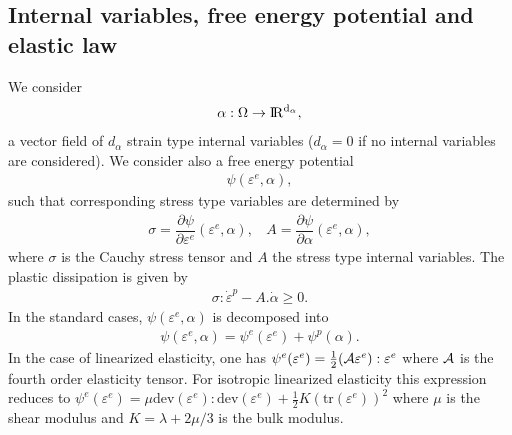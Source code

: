 \documentclass[a4paper,11pt,english]{sphinxmanual}
\begin{document}
\subsection{Internal variables, free energy potential and elastic law}
\label{\detokenize{userdoc/model_plasticity_small_strain:internal-variables-free-energy-potential-and-elastic-law}}
We consider
\begin{equation*}
\begin{split}\alpha : \Omega \rightarrow \rm I\hspace{-0.15em}R^{d_{\alpha}},\end{split}
\end{equation*}
a vector field of \(d_{\alpha}\) strain type internal variables (\(d_{\alpha} = 0\) if no internal variables are considered). We consider also a free energy potential
\begin{equation*}
\begin{split}\psi(\varepsilon^e, \alpha),\end{split}
\end{equation*}
such that corresponding stress type variables are determined by
\begin{equation*}
\begin{split}\sigma = \dfrac{\partial \psi}{\partial \varepsilon^e}(\varepsilon^e, \alpha), ~~~~ A =  \dfrac{\partial \psi}{\partial \alpha}(\varepsilon^e, \alpha),\end{split}
\end{equation*}
where \(\sigma\) is the Cauchy stress tensor and \(A\) the stress type internal variables. The plastic dissipation is given by
\begin{equation*}
\begin{split}\sigma:\dot{\varepsilon}^p - A.\dot{\alpha} \ge 0.\end{split}
\end{equation*}
In the standard cases, \(\psi(\varepsilon^e, \alpha)\) is decomposed into
\begin{equation*}
\begin{split}\psi(\varepsilon^e, \alpha) = \psi^e(\varepsilon^e) + \psi^p(\alpha).\end{split}
\end{equation*}
In the case of linearized elasticity, one has \(\psi^e(\varepsilon^e) = \frac{1}{2} ({\cal A}\varepsilon^e) :\varepsilon^e\) where \({\cal A}\) is the fourth order elasticity tensor. For isotropic linearized elasticity this expression reduces to \(\psi^e(\varepsilon^e) = \mu \mbox{dev}(\varepsilon^e) : \mbox{dev}(\varepsilon^e) + \frac{1}{2} K (\mbox{tr}(\varepsilon^e))^2\) where \(\mu\) is the shear modulus and \(K = \lambda + 2\mu/3\) is the bulk modulus.
\end{document}
